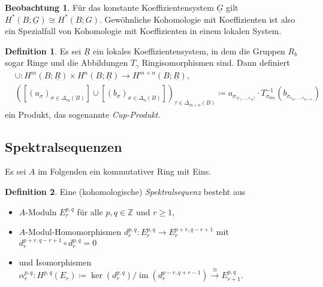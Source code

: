 \documentclass[11pt, a4paper, german]{article}
\theoremstyle{definition}
\newtheorem*{defn}{Definition}
\newtheorem*{beob}{Beobachtung}
\theoremstyle{remark}
\newcommand{\Z}{\mathbb{Z}} %
\DeclareMathOperator{\im}{im} %
\newcommand{\angles}[1]{{\langle #1 \rangle}}
\newcommand{\ES}{Es sei} %
\begin{document}
\begin{beob}
  Für das konstante Koeffizientensystem $\underline{G}$ gilt $H^*(B; \underline{G}) \cong H^*(B; G)$.
  Gewöhnliche Kohomologie mit Koeffizienten ist also ein Spezialfall von Kohomologie mit Koeffizienten in einem lokalen System.
\end{beob}

\begin{defn}
  Es sei $\underline{R}$ ein lokales Koeffizientensystem, in dem die Gruppen $R_b$ sogar Ringe und die Abbildungen $T_\gamma$ Ringisomorphismen sind. Dann definiert
  \begin{align*}
    & \cup : H^m(B; \underline{R}) \times H^n(B; \underline{R}) \to H^{m+n}(B; \underline{R}), \\
    & ([(a_\sigma)_{\sigma \in \Delta_m(B)}] \cup [(b_\sigma)_{\sigma \in \Delta_n(B)}])_{\tau \in \Delta_{m+n}(B)} \coloneqq a_{\sigma_{\angles{e_1, \ldots, e_m}}} \cdot T_{\sigma_{0m}}^{-1}(b_{\sigma_{e_m, \ldots, e_{m+n}}})
  \end{align*}
  ein Produkt, das sogenannte \emph{Cup-Produkt}.
\end{defn}

\subsection{Spektralsequenzen}


\ES{} $A$ im Folgenden ein kommutativer Ring mit Eins.

\begin{defn}
  Eine (kohomologische) \emph{Spektralsequenz} besteht aus
  \begin{itemize}
    \item $A$-Moduln $E_r^{p,q}$ für alle $p, q \in \Z$ und $r \geq 1$,
    \item $A$-Modul-Homomorphismen $d_r^{p,q} : E_r^{p,q} \to E_r^{p+r,q-r+1}$ mit $d_r^{p+r,q-r+1} \circ d_r^{p,q} = 0$
    \item und Isomorphismen $\alpha_r^{p,q} : H^{p,q}(E_r) \!\coloneqq\! \ker(d_r^{p,q}) / \im(d_r^{p-r,q+r-1}) \xrightarrow{\cong} E_{r+1}^{p,q}$.
  \end{itemize}
\end{defn}
\end{document}
